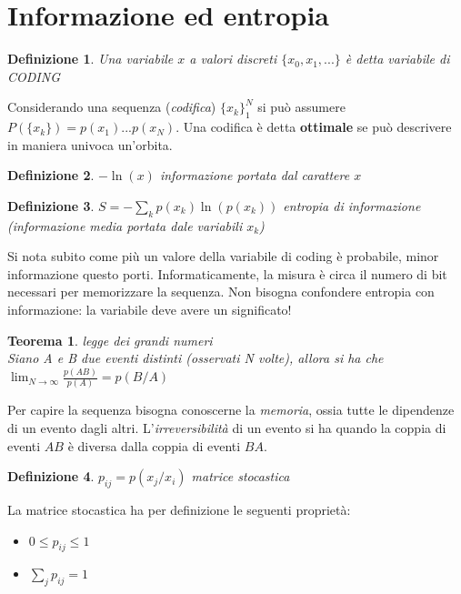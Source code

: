 \documentclass[12pt, a4paper]{article}
\theoremstyle{theorem}
\newtheorem{definition}{Definizione}[section]
\newtheorem{theorem}{Teorema}[section]
\begin{document}
	\section{Informazione ed entropia}
		\begin{definition}
			Una variabile $x$ a valori discreti $\{x_0,x_1,...\}$ è detta variabile di CODING
		\end{definition}
		Considerando una sequenza (\textit{codifica}) $\{x_k\}_1^N$ si può assumere $P(\{x_k\})=p(x_1)...p(x_N)$.
		Una codifica è detta \textbf{ottimale} se può descrivere in maniera univoca un'orbita.
		\begin{definition}
			$-\ln(x)$ informazione portata dal carattere $x$
		\end{definition}
		\begin{definition}
			$S=-\sum_kp(x_k)\ln(p(x_k))$ entropia di informazione (informazione media portata dale variabili $x_k$)
		\end{definition}
		Si nota subito come più un valore della variabile di coding è probabile, minor informazione questo porti.
		Informaticamente, la misura è circa il numero di bit necessari per memorizzare la sequenza.
		Non bisogna confondere entropia con informazione: la variabile deve avere un significato!
		\begin{theorem}
			legge dei grandi numeri\\
			Siano A e B due eventi distinti (osservati N volte), allora si ha che $\lim_{N\to\infty}\frac{p(AB)}{p(A)}=p(B/A)$
		\end{theorem}
		Per capire la sequenza bisogna conoscerne la \textit{memoria}, ossia tutte le dipendenze di un evento dagli altri.
		L'\textit{irreversibilità} di un evento si ha quando la coppia di eventi $AB$ è diversa dalla coppia di eventi $BA$.
		\begin{definition}
			$p_{ij}=p(x_j/x_i)$ matrice stocastica
		\end{definition}
		La matrice stocastica ha per definizione le seguenti proprietà:
		\begin{itemize}
			\item $0\leq p_{ij}\leq 1$
			\item $\sum_jp_{ij}=1$
		\end{itemize}
\end{document}
